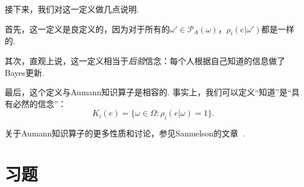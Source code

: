 接下来，我们对这一定义做几点说明. 

首先，这一定义是良定义的，因为对于所有的$\omega'\in\mathcal P_A(\omega)$，$\rho_i(e|\omega')$都是一样的.

其次，直观上说，这一定义相当于\textit{后验}信念：每个人根据自己知道的信息做了Bayes更新.

最后，这个定义与Aumann知识算子是相容的. 事实上，我们可以定义“知道”是“具有必然的信念”：
\[K_i(e)=\{\omega\in\Omega:\rho_i(e|\omega) = 1\}.\]

\begin{remark}
    关于Aumann知识算子的更多性质和讨论，参见Samuelson的文章~\cite{samuelsonModelingKnowledgeEconomic2004}. 
\end{remark}

\section{习题}

